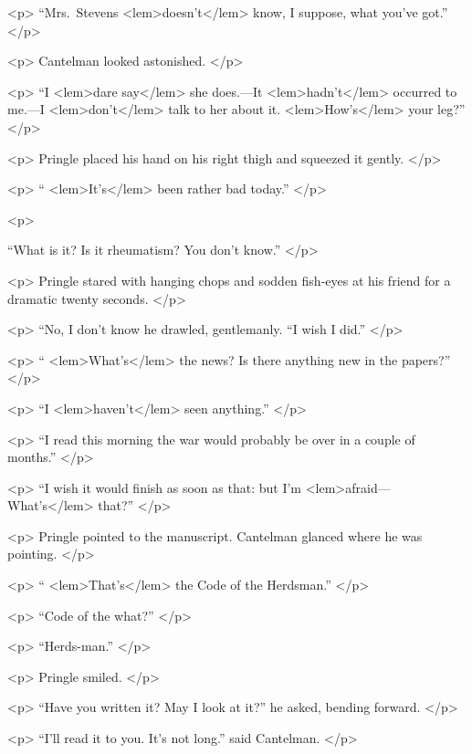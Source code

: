 {{				<p>
				“Mrs.\ Stevens 
<lem>doesn't</lem>
					{} 
				know, I suppose, what you've got.” 
 				</p> 

				<p>
				Cantelman looked astonished. 
 				</p> 

				<p>
				“I 
<lem>dare say</lem>
					{} 
				she does.---It 
<lem>hadn't</lem>{} occurred to me.---I 
<lem>don't</lem>
					{} 
				talk to her about it. 
<lem>How's</lem>{} 
				your leg?” 
 				</p> 

				<p>
				Pringle placed his hand on his right thigh and squeezed it gently. 
 				</p> 

				<p>
				“
<lem>It's</lem>
					{} 
				been rather bad today.” 
				</p> 

				<p>
				 
				“What is it? Is it rheumatism? You don't know.” 
 				</p> 

				<p>
				Pringle stared with hanging chops and sodden fish-eyes at his friend for a dramatic 
				twenty seconds. 
 				</p> 

				<p>
				“No, I don't know he drawled, gentlemanly. “I wish I did.” 
 				</p> 

				<p>
				“
<lem>What's</lem>{} the news? Is there anything new in the papers?” 
 				</p> 

				<p>
				“I 
<lem>haven't</lem>{} seen anything.” 
 				</p> 

				<p>
				“I read this morning the war would probably be over in a couple of months.” 
 				</p> 

				<p>
				“I wish it would finish as soon as that: but I'm 
<lem>afraid--- What's</lem>
					{} 
				that?” 
 				</p> 

				<p>
				Pringle pointed to the manuscript. Cantelman glanced where he was pointing. 
 				</p> 

				<p>
				“
<lem>That's</lem>{} the Code of the Herdsman.” 
 				</p> 

				<p>
				“Code of the what?” 
 				</p> 

				<p>
				“Herds-man.” 
 				</p> 

				<p>
				Pringle smiled. 
 				</p> 

				<p>
				“Have you written it? May I look at it?” he asked, bending forward. 
 				</p> 

				<p>
				“I'll read it to you. It's not long.” said Cantelman. 
 				</p> 

}}
